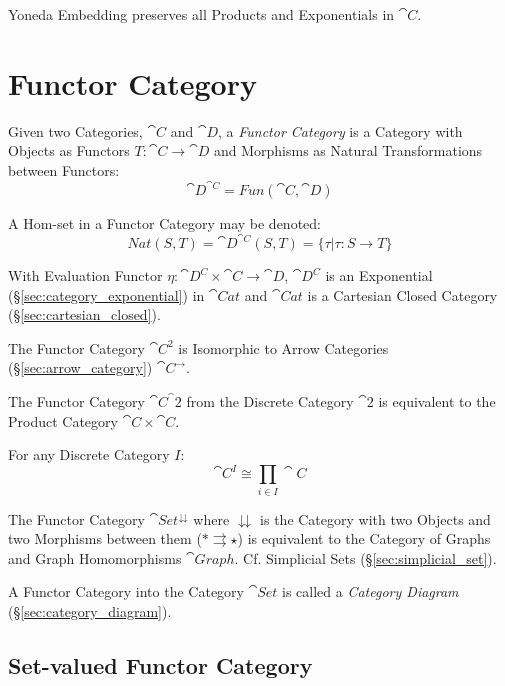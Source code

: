 Yoneda Embedding preserves all Products and Exponentials in
$\cat{C}$.



\section{Functor Category}\label{sec:functor_category}

Given two Categories, $\cat{C}$ and $\cat{D}$, a \emph{Functor
  Category} is a Category with Objects as Functors $T : \cat{C}
\rightarrow \cat{D}$ and Morphisms as Natural Transformations
between Functors:
\[
  \cat{D}^{\cat{C}} = Fun(\cat{C},\cat{D})
\]

A Hom-set in a Functor Category may be denoted:
\[
  Nat(S,T) = \cat{D}^{\cat{C}}(S,T) =
    \{ \tau | \tau : S \rightarrow T \}
\]

With Evaluation Functor $\eta : \cat{D^C} \times \cat{C} \rightarrow
\cat{D}$, $\cat{D^C}$ is an Exponential
(\S\ref{sec:category_exponential}) in $\cat{Cat}$ and $\cat{Cat}$ is a
Cartesian Closed Category (\S\ref{sec:cartesian_closed}).

The Functor Category $\cat{C^2}$ is Isomorphic to Arrow Categories
(\S\ref{sec:arrow_category}) $\cat{C}^\rightarrow$.

The Functor Category $\cat{C}^\cat{2}$ from the Discrete Category
$\cat{2}$ is equivalent to the Product Category $\cat{C} \times
\cat{C}$.

For any Discrete Category $I$:
\[
  \cat{C}^I \cong \prod_{i \in I} \cat{C}
\]

The Functor Category $\cat{Set}^\downdownarrows$ where
$\downdownarrows$ is the Category with two Objects and two Morphisms
between them ($* \rightrightarrows \star$) is equivalent to the
Category of Graphs and Graph Homomorphisms $\cat{Graph}$. Cf.
Simplicial Sets (\S\ref{sec:simplicial_set}).

A Functor Category into the Category $\cat{Set}$ is called a
\emph{Category Diagram} (\S\ref{sec:category_diagram}).



\subsection{Set-valued Functor Category}\label{sec:setvalued_functor}

